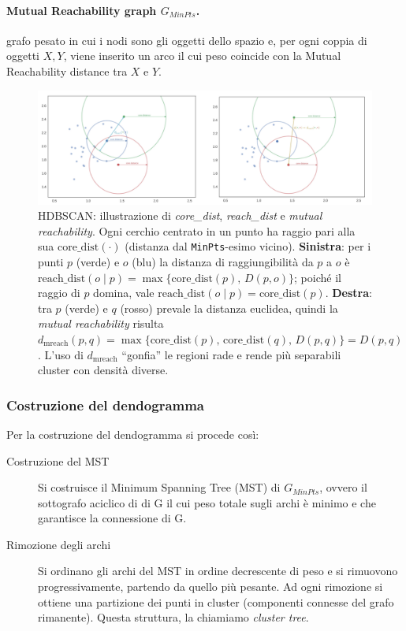 \paragraph{Mutual Reachability graph $G_{MinPts}$.} grafo pesato in cui i nodi sono gli oggetti dello spazio e, per ogni coppia di oggetti $X,Y$, viene inserito un arco il cui peso coincide con la Mutual Reachability distance tra $X$ e $Y$.

\begin{figure}[htbp]
  \centering
  \includegraphics[width=\textwidth]{images/HDBSCAN_example.png}
  \caption{HDBSCAN: illustrazione di \emph{core\_dist}, \emph{reach\_dist} e \emph{mutual reachability}.
  Ogni cerchio centrato in un punto ha raggio pari alla sua $\mathrm{core\_dist}(\cdot)$
  (distanza dal \texttt{MinPts}-esimo vicino). \textbf{Sinistra}: per i punti $p$ (verde) e $o$ (blu)
  la distanza di raggiungibilità da $p$ a $o$ è
  $\mathrm{reach\_dist}(o\mid p)=\max\{\mathrm{core\_dist}(p),\,D(p,o)\}$; poiché il raggio di $p$ domina,
  vale $\mathrm{reach\_dist}(o\mid p)=\mathrm{core\_dist}(p)$. \textbf{Destra}: tra $p$ (verde) e $q$ (rosso)
  prevale la distanza euclidea, quindi la \emph{mutual reachability} risulta
  $d_{\mathrm{mreach}}(p,q)=\max\{\mathrm{core\_dist}(p),\,\mathrm{core\_dist}(q),\,D(p,q)\}=D(p,q)$.
  L'uso di $d_{\mathrm{mreach}}$ ``gonfia'' le regioni rade e rende più separabili cluster con densità diverse.}
  \label{fig:hdbscan-example}
\end{figure}

\subsubsection*{Costruzione del dendogramma} 
Per la costruzione del dendogramma si procede così:
\begin{description}
  \item[Costruzione del MST] Si costruisce il Minimum Spanning Tree (MST) di \(G_{MinPts}\), ovvero il sottografo aciclico di di G il cui peso totale sugli archi è minimo e che garantisce la connessione di G.
  \item[Rimozione degli archi] Si ordinano gli archi del MST in ordine decrescente di peso e si rimuovono progressivamente, partendo da quello più pesante. Ad ogni rimozione si ottiene una partizione dei punti in cluster (componenti connesse del grafo rimanente). Questa struttura, la chiamiamo \emph{cluster tree}.
\end{description}

